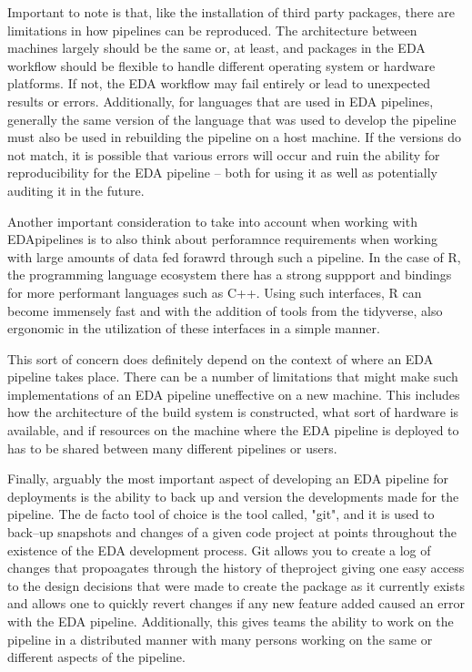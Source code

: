 \documentclass{amia}
\begin{document}
Important to note is that, like the installation of third party packages, there are limitations in how pipelines can be reproduced. 
The architecture between machines largely should be the same or, at least, and packages in the EDA workflow should be flexible to handle different operating system or hardware platforms.
If not, the EDA workflow may fail entirely or lead to unexpected results or errors. 
Additionally, for languages that are used in EDA pipelines, generally the same version of the language that was used to develop the pipeline must also be used in rebuilding the pipeline on a host machine.
If the versions do not match, it is possible that various errors will occur and ruin the ability for reproducibility for the EDA  pipeline -- both for using it as well as potentially auditing it in the future. 

Another important consideration to take into account when working with EDApipelines is to also think about perforamnce requirements when working with large amounts of data fed forawrd through such a pipeline.
In the case of R, the programming language ecosystem there has a strong suppport and bindings for more performant languages such as C++. 
Using such interfaces, R can become immensely fast and with the addition of tools from the tidyverse, also ergonomic in the utilization of these interfaces in a simple manner.

This sort of concern does definitely depend on the context of where an EDA pipeline takes place. 
There can be a number of limitations that might make such implementations of an EDA  pipeline uneffective on a new machine. 
This includes how the architecture of the build system is constructed, what sort of hardware is available, and if resources on the machine where the EDA  pipeline is deployed to has to be shared between many different pipelines or users. 

Finally, arguably the most important aspect of developing an EDA pipeline for deployments is the ability to back up and version the developments made for the pipeline.
The de facto tool of choice is the tool called, "git", and it is used to back--up snapshots and changes of a given code project at points throughout the existence of the EDA development process.
Git allows you to create a log of changes that propoagates through the history of theproject giving one easy access to the design decisions that were made to create the package as it currently exists and allows one to quickly revert changes if any new feature added caused an error with the EDA  pipeline.
Additionally, this gives teams the ability to work on the pipeline in a distributed manner with many persons working on the same or different aspects of the pipeline.
\end{document}

